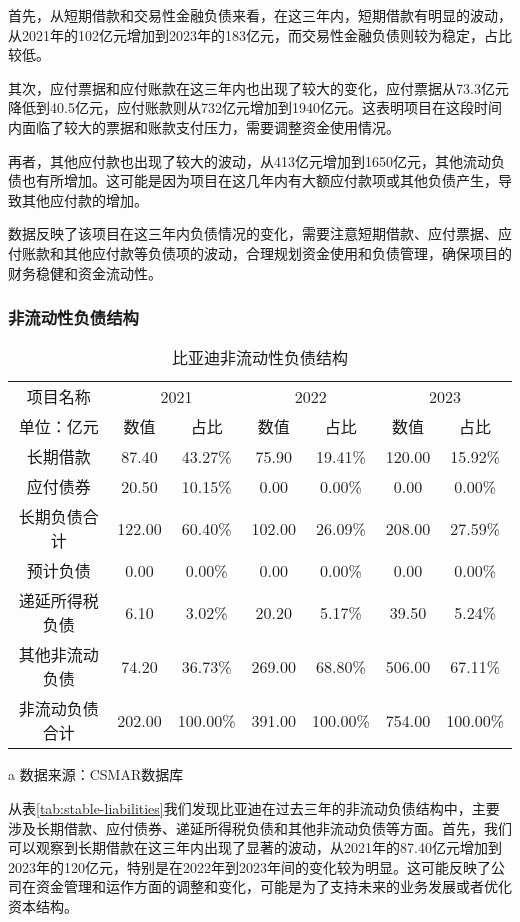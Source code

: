 首先，从短期借款和交易性金融负债来看，在这三年内，短期借款有明显的波动，从2021年的102亿元增加到2023年的183亿元，而交易性金融负债则较为稳定，占比较低。

其次，应付票据和应付账款在这三年内也出现了较大的变化，应付票据从73.3亿元降低到40.5亿元，应付账款则从732亿元增加到1940亿元。这表明项目在这段时间内面临了较大的票据和账款支付压力，需要调整资金使用情况。

再者，其他应付款也出现了较大的波动，从413亿元增加到1650亿元，其他流动负债也有所增加。这可能是因为项目在这几年内有大额应付款项或其他负债产生，导致其他应付款的增加。

数据反映了该项目在这三年内负债情况的变化，需要注意短期借款、应付票据、应付账款和其他应付款等负债项的波动，合理规划资金使用和负债管理，确保项目的财务稳健和资金流动性。
\subsubsection{非流动性负债结构}
\begin{table}
  \centering
  \begin{threeparttable}[c]
    \caption{比亚迪非流动性负债结构}
    \label{tab:stable-liabilities}
    \begin{tabular}{ccccccc}
      \toprule
      项目名称 & \multicolumn{2}{c}{2021} & \multicolumn{2}{c}{2022} & \multicolumn{2}{c}{2023} \\ 
        单位：亿元 & 数值 & 占比 & 数值 & 占比 & 数值 & 占比 \\ 
      \midrule
        长期借款 & 87.40  & 43.27\% & 75.90  & 19.41\% & 120.00  & 15.92\% \\ 
        应付债券 & 20.50  & 10.15\% & 0.00  & 0.00\% & 0.00  & 0.00\% \\ 
        长期负债合计 & 122.00  & 60.40\% & 102.00  & 26.09\% & 208.00  & 27.59\% \\ 
        预计负债 & 0.00  & 0.00\% & 0.00  & 0.00\% & 0.00  & 0.00\% \\ 
        递延所得税负债 & 6.10  & 3.02\% & 20.20  & 5.17\% & 39.50  & 5.24\% \\ 
        其他非流动负债 & 74.20  & 36.73\% & 269.00  & 68.80\% & 506.00  & 67.11\% \\ 
        非流动负债合计 & 202.00  & 100.00\% & 391.00  & 100.00\% & 754.00  & 100.00\% \\ 
      \bottomrule
    \end{tabular}
    \begin{tablenotes}
      \item [a] 数据来源：CSMAR数据库
    \end{tablenotes}
  \end{threeparttable}
\end{table}
从表\eqref{tab:stable-liabilities}我们发现比亚迪在过去三年的非流动负债结构中，主要涉及长期借款、应付债券、递延所得税负债和其他非流动负债等方面。首先，我们可以观察到长期借款在这三年内出现了显著的波动，从2021年的87.40亿元增加到2023年的120亿元，特别是在2022年到2023年间的变化较为明显。这可能反映了公司在资金管理和运作方面的调整和变化，可能是为了支持未来的业务发展或者优化资本结构。

